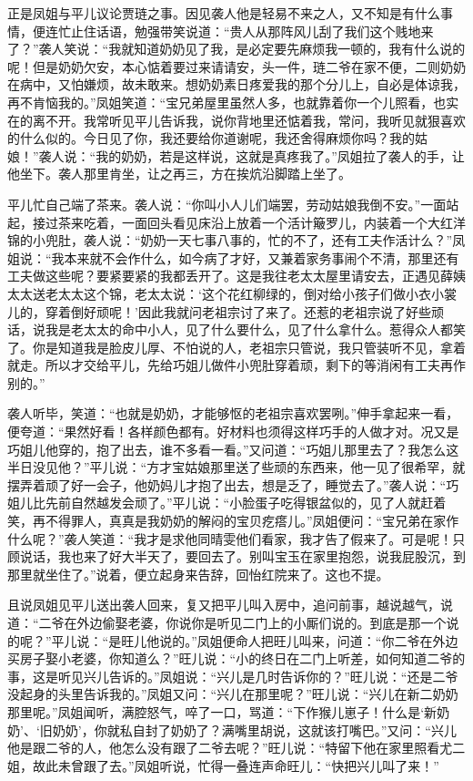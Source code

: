正是凤姐与平儿议论贾琏之事。因见袭人他是轻易不来之人，又不知是有什么事情，便连忙止住话语，勉强带笑说道：“贵人从那阵风儿刮了我们这个贱地来了？”袭人笑说：“我就知道奶奶见了我，是必定要先麻烦我一顿的，我有什么说的呢！但是奶奶欠安，本心惦着要过来请请安，头一件，琏二爷在家不便，二则奶奶在病中，又怕嫌烦，故未敢来。想奶奶素日疼爱我的那个分儿上，自必是体谅我，再不肯恼我的。”凤姐笑道：“宝兄弟屋里虽然人多，也就靠着你一个儿照看，也实在的离不开。我常听见平儿告诉我，说你背地里还惦着我，常问，我听见就狠喜欢的什么似的。今日见了你，我还要给你道谢呢，我还舍得麻烦你吗？我的姑娘！”袭人说：“我的奶奶，若是这样说，这就是真疼我了。”凤姐拉了袭人的手，让他坐下。袭人那里肯坐，让之再三，方在挨炕沿脚踏上坐了。

平儿忙自己端了茶来。袭人说：“你叫小人儿们端罢，劳动姑娘我倒不安。”一面站起，接过茶来吃着，一面回头看见床沿上放着一个活计簸罗儿，内装着一个大红洋锦的小兜肚，袭人说：“奶奶一天七事八事的，忙的不了，还有工夫作活计么？”凤姐说：“我本来就不会作什么，如今病了才好，又兼着家务事闹个不清，那里还有工夫做这些呢？要紧要紧的我都丢开了。这是我往老太太屋里请安去，正遇见薛姨太太送老太太这个锦，老太太说：‘这个花红柳绿的，倒对给小孩子们做小衣小裳儿的，穿着倒好顽呢！’因此我就问老祖宗讨了来了。还惹的老祖宗说了好些顽话，说我是老太太的命中小人，见了什么要什么，见了什么拿什么。惹得众人都笑了。你是知道我是脸皮儿厚、不怕说的人，老祖宗只管说，我只管装听不见，拿着就走。所以才交给平儿，先给巧姐儿做件小兜肚穿着顽，剩下的等消闲有工夫再作别的。”

袭人听毕，笑道：“也就是奶奶，才能够怄的老祖宗喜欢罢咧。”伸手拿起来一看，便夸道：“果然好看！各样颜色都有。好材料也须得这样巧手的人做才对。况又是巧姐儿他穿的，抱了出去，谁不多看一看。”又问道：“巧姐儿那里去了？我怎么这半日没见他？”平儿说：“方才宝姑娘那里送了些顽的东西来，他一见了很希罕，就摆弄着顽了好一会子，他奶妈儿才抱了出去，想是乏了，睡觉去了。”袭人说：“巧姐儿比先前自然越发会顽了。”平儿说：“小脸蛋子吃得银盆似的，见了人就赶着笑，再不得罪人，真真是我奶奶的解闷的宝贝疙瘩儿。”凤姐便问：“宝兄弟在家作什么呢？”袭人笑道：“我才是求他同晴雯他们看家，我才告了假来了。可是呢！只顾说话，我也来了好大半天了，要回去了。别叫宝玉在家里抱怨，说我屁股沉，到那里就坐住了。”说着，便立起身来告辞，回怡红院来了。这也不提。

且说凤姐见平儿送出袭人回来，复又把平儿叫入房中，追问前事，越说越气，说道：“二爷在外边偷娶老婆，你说你是听见二门上的小厮们说的。到底是那一个说的呢？”平儿说：“是旺儿他说的。”凤姐便命人把旺儿叫来，问道：“你二爷在外边买房子娶小老婆，你知道么？”旺儿说：“小的终日在二门上听差，如何知道二爷的事，这是听见兴儿告诉的。”凤姐说：“兴儿是几时告诉你的？”旺儿说：“还是二爷没起身的头里告诉我的。”凤姐又问：“兴儿在那里呢？”旺儿说：“兴儿在新二奶奶那里呢。”凤姐闻听，满腔怒气，啐了一口，骂道：“下作猴儿崽子！什么是‘新奶奶’、‘旧奶奶’，你就私自封了奶奶了？满嘴里胡说，这就该打嘴巴。”又问：“兴儿他是跟二爷的人，他怎么没有跟了二爷去呢？”旺儿说：“特留下他在家里照看尤二姐，故此未曾跟了去。”凤姐听说，忙得一叠连声命旺儿：“快把兴儿叫了来！”

